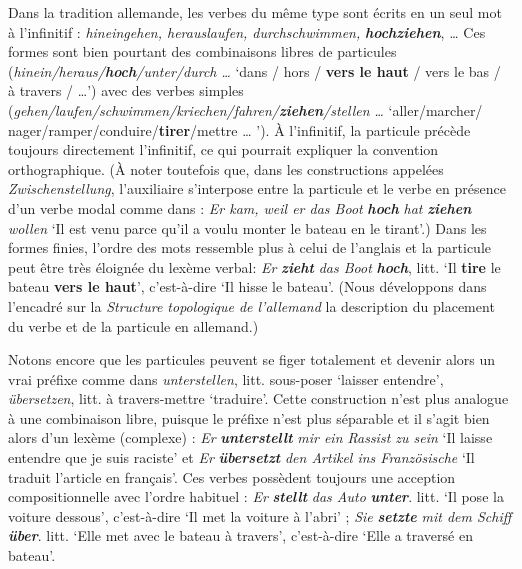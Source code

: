 {    Dans la tradition allemande, les verbes du même type sont écrits en un seul mot à l’infinitif : \textit{hineingehen, herauslaufen, durchschwimmen,} \textbf{\textit{hochziehen}}, \textit{…} Ces formes sont bien pourtant des combinaisons libres de particules (\textit{hinein/heraus/}\textbf{\textit{hoch}}\textit{/unter/durch} \textit{…} ‘dans / hors / \textbf{vers le haut} / vers le bas / à travers / …’) avec des verbes simples (\textit{gehen/laufen/schwimmen/kriechen/fahren/}\textbf{\textit{ziehen}}\textit{/stellen} \textit{…} ‘aller/marcher/ nager/ramper/conduire/\textbf{tirer}/mettre … ’). À l’infinitif, la particule précède toujours directement l’infinitif, ce qui pourrait expliquer la convention orthographique. (À noter toutefois que, dans les constructions appelées \textit{Zwischenstellung}, l’auxiliaire s’interpose entre la particule et le verbe en présence d’un verbe modal comme dans : \textit{Er kam, weil er das Boot} \textbf{\textit{hoch}} \textit{hat} \textbf{\textit{ziehen}} \textit{wollen} ‘Il est venu parce qu’il a voulu monter le bateau en le tirant’.) Dans les formes finies, l’ordre des mots ressemble plus à celui de l’anglais et la particule peut être très éloignée du lexème verbal: \textit{Er} \textbf{\textit{zieht}} \textit{das Boot} \textbf{\textit{hoch}}, litt. ‘Il \textbf{tire} le bateau \textbf{vers le haut}’, c’est-à-dire ‘Il hisse le bateau’. (Nous développons dans l'encadré  sur la \textit{Structure topologique de l’allemand} la description du placement du verbe et de la particule en allemand.)

    Notons encore que les particules peuvent se figer totalement et devenir alors un vrai préfixe comme dans \textit{unterstellen}, litt. sous-poser ‘laisser entendre’, \textit{übersetzen}, litt. à travers-mettre ‘traduire’. Cette construction n’est plus analogue à une combinaison libre, puisque le préfixe n’est plus séparable et il s’agit bien alors d’un lexème (complexe) : \textit{Er} \textbf{\textit{unterstellt}} \textit{mir ein Rassist zu sein} ‘Il laisse entendre que je suis raciste’ et \textit{Er} \textbf{\textit{übersetzt}} \textit{den Artikel ins Französische} ‘Il traduit l’article en français’. Ces verbes possèdent toujours une acception compositionnelle avec l’ordre habituel : \textit{Er} \textbf{\textit{stellt}} \textit{das Auto} \textbf{\textit{unter}}. litt. ‘Il pose la voiture dessous’, c’est-à-dire ‘Il met la voiture à l’abri’ ; \textit{Sie} \textbf{\textit{setzte}} \textit{mit dem Schiff} \textbf{\textit{über}}. litt. ‘Elle met avec le bateau à travers’, c’est-à-dire ‘Elle a traversé en bateau’.

}
